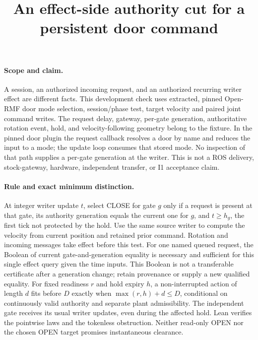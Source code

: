 \documentclass{article}
\title{An effect-side authority cut for a persistent door command}
\begin{document}
\maketitle

\paragraph{Scope and claim.}
A session, an authorized incoming request, and an authorized recurring writer effect are different facts. This development check uses extracted, pinned Open-RMF door mode selection, session/phase test, target velocity and paired joint command writes. The request delay, gateway, per-gate generation, authoritative rotation event, hold, and velocity-following geometry belong to the fixture. In the pinned door plugin the request callback resolves a door by name and reduces the input to a mode; the update loop consumes that stored mode. No inspection of that path supplies a per-gate generation at the writer. This is not a ROS delivery, stock-gateway, hardware, independent transfer, or I1 acceptance claim.

\paragraph{Rule and exact minimum distinction.}
At integer writer update \(t\), select CLOSE for gate \(g\) only if a request is present at that gate, its authority generation equals the current one for \(g\), and \(t\ge h_g\), the first tick not protected by the hold. Use the same source writer to compute the velocity from current position and retained prior command. Rotation and incoming messages take effect before this test. For one named queued request, the Boolean of current gate-and-generation equality is necessary and sufficient for this single effect query given the time inputs. This Boolean is not a transferable certificate after a generation change; retain provenance or supply a new qualified equality. For fixed readiness \(r\) and hold expiry \(h\), a non-interrupted action of length \(d\) fits before \(D\) exactly when \(\max(r,h)+d\le D\), conditional on continuously valid authority and separate plant admissibility. The independent gate receives its usual writer updates, even during the affected hold. Lean verifies the pointwise laws and the tokenless obstruction. Neither read-only OPEN nor the chosen OPEN target promises instantaneous clearance.
\end{document}
